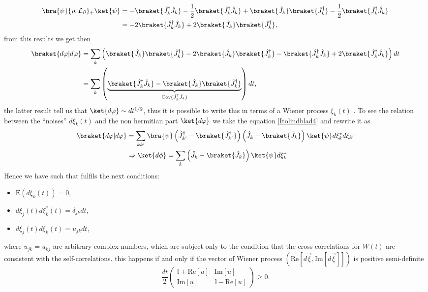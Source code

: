 \begin{align*}
\bra{\psi}\{\varrho,\mathcal{L}\varrho\}_{+}\ket{\psi}&=-\braket{\hat{J}_k^{\dagger}\hat{J}_k}-\frac{1}{2}\braket{\hat{J}_k^{\dagger}\hat{J}_k}+\braket{\hat{J}_k}\braket{\hat{J}_k^{\dagger}}-\frac{1}{2}\braket{\hat{J}_k^{\dagger}\hat{J}_k}\\
&=-2 \braket{\hat{J}_k^{\dagger}\hat{J}_k}+2\braket{\hat{J}_k}\braket{\hat{J}_k^{\dagger}},
\end{align*}
from this results we get then \cite{articlediosi2}
\begin{align}
\braket{d\varphi|d\varphi}&=\sum_{k}\left(\braket{\hat{J}_k}\braket{\hat{J}_k^{\dagger}}-2\braket{\hat{J}_k}\braket{\hat{J}_k^{\dagger}}-\braket{\hat{J}_k^{\dagger}\hat{J}_k}+2\braket{\hat{J}_k^{\dagger}\hat{J}_k}\right)dt\nonumber\\
&=\sum_{k}\left(\underbrace{\braket{\hat{J}_k^{\dagger}\hat{J}_k}-\braket{\hat{J}_k}\braket{\hat{J}_k^{\dagger}}}_{\text{Cov}(\hat{J}_k^{\dagger}\hat{J}_k)}\right)dt,
\label{Itolindblad4}
\end{align}
the latter result tell us that $\ket{d\varphi}\sim dt^{1/2}$, thus it is possible to write this in terms of a Wiener process $\xi_{k}(t)$ . To see the relation between the ``noises'' $d\xi_{k}(t)$  and the non hermitian part $\ket{d\varphi}$ we take the equation \eqref{Itolindblad4} and rewrite it as
\begin{align}
\braket{d\varphi|d\varphi}&=\sum_{kk'}\bra{\psi}\left(\hat{J}_{k'}^{\dagger}-\braket{\hat{J}_{k'}^{\dagger}}\right)\left(\hat{J}_{k}-\braket{\hat{J}_{k}}\right)\ket{\psi}d\xi_{k}^{*}d\xi_{k'}\nonumber\\
&\Rightarrow \ket{d\phi}=\sum_{k}\left(\hat{J}_{k}-\braket{\hat{J}_{k}}\right)\ket{\psi}d\xi_{k}^{*}.
\label{Itolindblad5}
\end{align}
Hence we have such that fulfils the next conditions:
\begin{itemize}
\item $\text{E}(d\xi_k(t))=0$,
\item $d\xi_{j}(t)d\xi^{*}_k(t)=\delta_{jk}dt$,
\item $d\xi_{j}(t)d\xi_{k}(t)=u_{jk}dt$,
\end{itemize}
where $u_{jk}=u_{kj}$ are arbitrary complex numbers, which are subject only to the condition that the cross-correlations for $W(t)$ are consistent with the self-correlations. this happens if and only if the vector of Wiener process $(\text{Re}[d\vec{\xi},\text{Im}[d\vec{\xi}]])$ is positive semi-definite\cite{Wiseman}
\begin{equation}
\frac{dt}{2}\begin{pmatrix}
\mathbb{I}+\text{Re}[u] & \text{Im}[u]\\
\text{Im}[u] & \mathbb{I}-\text{Re}[u]
\end{pmatrix}\geq 0.
\label{conditionoveru}
\end{equation}
